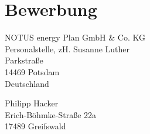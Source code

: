 \documentclass[11pt,a4paper]{moderncv}
\newcommand{\position}{%
    Physikers, Meteorologen oder Luft- und Raumfahrtingenieurs (m/w/d)}
\begin{document}
    \newpage
    \makeatletter
    \chapter{Bewerbung}{}

    \vspace*{1.0cm}
    \begin{minipage}{0.6\textwidth}
        \begin{flushleft}
            NOTUS energy Plan GmbH \& Co. KG\\%
            Personalstelle, zH. Susanne Luther\\%
            Parkstraße \\%
            14469 Potsdam\\%
            Deutschland
        \end{flushleft}
    \end{minipage}
    \hfill
    \begin{minipage}{0.3\textwidth}
        \begin{flushright}
            Philipp Hacker\\%
            Erich-Böhmke-Straße 22a\\%
            17489 Greifswald
        \end{flushright}
    \end{minipage}
\end{document}
